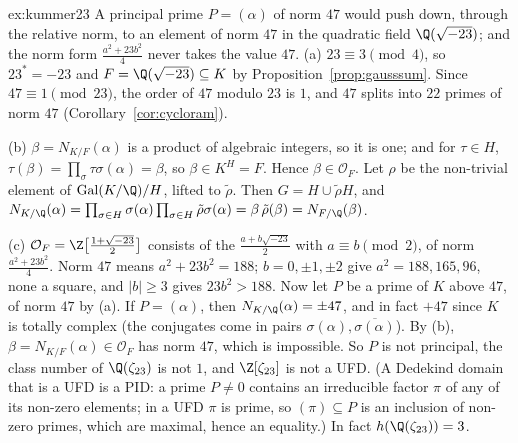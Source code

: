 \begin{solution}{ex:kummer23}
\idea A principal prime $P=(\alpha)$ of norm $47$ would push down, through the relative norm, to an element of norm $47$ in the
quadratic field $\Q(\sqrt{-23})$; and the norm form $\frac{a^2+23b^2}4$ never takes the value $47$.
\writeup (a) $23\equiv3\pmod4$, so $23^*=-23$ and $F=\Q(\sqrt{-23})\subseteq K$ by Proposition~\ref{prop:gausssum}. Since
$47\equiv1\pmod{23}$, the order of $47$ modulo $23$ is $1$, and $47$ splits into $22$ primes of norm $47$
(Corollary~\ref{cor:cycloram}).

(b) $\beta=N_{K/F}(\alpha)$ is a product of algebraic integers, so it is one; and for $\tau\in H$, $\tau(\beta)=\prod_\sigma
\tau\sigma(\alpha)=\beta$, so $\beta\in K^H=F$. Hence $\beta\in\mathcal O_F$. Let $\rho$ be the non-trivial element of
$\operatorname{Gal}(K/\Q)/H$, lifted to $\tilde\rho$. Then $G=H\cup\tilde\rho H$, and
$N_{K/\Q}(\alpha)=\prod_{\sigma\in H}\sigma(\alpha)\prod_{\sigma\in H}\tilde\rho\sigma(\alpha)=\beta\,\tilde\rho(\beta)=N_{F/\Q}(\beta)$.

(c) $\mathcal O_F=\Z\bigl[\frac{1+\sqrt{-23}}2\bigr]$ consists of the $\frac{a+b\sqrt{-23}}2$ with $a\equiv b\pmod2$, of norm
$\frac{a^2+23b^2}4$. Norm $47$ means $a^2+23b^2=188$; $b=0,\pm1,\pm2$ give $a^2=188,165,96$, none a square, and $|b|\ge3$ gives
$23b^2>188$. Now let $P$ be a prime of $K$ above $47$, of norm $47$ by (a). If $P=(\alpha)$, then $N_{K/\Q}(\alpha)=\pm47$, and
in fact $+47$ since $K$ is totally complex (the conjugates come in pairs $\sigma(\alpha),\overline{\sigma(\alpha)}$). By (b),
$\beta=N_{K/F}(\alpha)\in\mathcal O_F$ has norm $47$, which is impossible. So $P$ is not principal, the class number of
$\Q(\zeta_{23})$ is not $1$, and $\Z[\zeta_{23}]$ is not a UFD. (A Dedekind domain that is a UFD is a PID: a prime $P\ne0$ contains an
irreducible factor $\pi$ of any of its non-zero elements; in a UFD $\pi$ is prime, so $(\pi)\subseteq P$ is an inclusion of
non-zero primes, which are maximal, hence an equality.) In fact $h(\Q(\zeta_{23}))=3$.
\end{solution}

